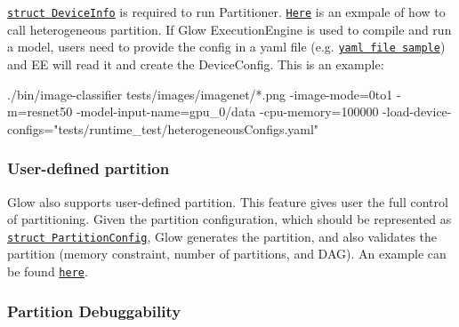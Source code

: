 \href{https://github.com/pytorch/glow/blob/master/include/glow/Runtime/RuntimeTypes.h#L50}{\tt {\ttfamily struct Device\+Info}} is required to run Partitioner. \href{https://github.com/pytorch/glow/blob/master/tests/unittests/PartitionerTest.cpp#L614}{\tt Here} is an exmpale of how to call heterogeneous partition. If Glow Execution\+Engine is used to compile and run a model, users need to provide the config in a yaml file (e.\+g. \href{https://github.com/pytorch/glow/blob/master/tests/runtime_test/heterogeneousConfigs.yaml}{\tt yaml file sample}) and EE will read it and create the Device\+Config. This is an example\+: 
\begin{DoxyCode}
./bin/image-classifier tests/images/imagenet/*.png -image-mode=0to1 -m=resnet50
       -model-input-name=gpu\_0/data -cpu-memory=100000 -load-device-configs="tests/runtime\_test/heterogeneousConfigs.yaml"
\end{DoxyCode}


\subsubsection*{User-\/defined partition}

Glow also supports user-\/defined partition. This feature gives user the full control of partitioning. Given the partition configuration, which should be represented as \href{https://github.com/pytorch/glow/blob/master/include/glow/Runtime/RuntimeTypes.h#L181}{\tt {\ttfamily struct Partition\+Config}}, Glow generates the partition, and also validates the partition (memory constraint, number of partitions, and D\+AG). An example can be found \href{https://github.com/pytorch/glow/blob/master/tests/unittests/PartitionerTest.cpp#L977}{\tt here}.

\subsubsection*{Partition Debuggability}

